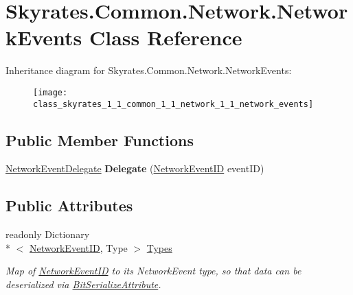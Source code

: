 \hypertarget{class_skyrates_1_1_common_1_1_network_1_1_network_events}{\section{Skyrates.\-Common.\-Network.\-Network\-Events Class Reference}
\label{class_skyrates_1_1_common_1_1_network_1_1_network_events}
}
Inheritance diagram for Skyrates.\-Common.\-Network.\-Network\-Events\-:\begin{figure}[H]
\begin{center}
\leavevmode
\texttt{[image: class\_skyrates\_1\_1\_common\_1\_1\_network\_1\_1\_network\_events]}
\end{center}
\end{figure}
\subsection*{Public Member Functions}
\begin{DoxyCompactItemize}
\item 
\hypertarget{class_skyrates_1_1_common_1_1_network_1_1_network_events_a8113fa3394ce40bd2caf8071863a3679}{\hyperlink{namespace_skyrates_1_1_common_1_1_network_a87882c06bd9c9c4138d4e098242f7b67}{Network\-Event\-Delegate} {\bfseries Delegate} (\hyperlink{namespace_skyrates_1_1_common_1_1_network_a90fc6faa44c44b4284114e861d3e761a}{Network\-Event\-I\-D} event\-I\-D)}\label{class_skyrates_1_1_common_1_1_network_1_1_network_events_a8113fa3394ce40bd2caf8071863a3679}

\end{DoxyCompactItemize}
\subsection*{Public Attributes}
\begin{DoxyCompactItemize}
\item 
readonly Dictionary\\*
$<$ \hyperlink{namespace_skyrates_1_1_common_1_1_network_a90fc6faa44c44b4284114e861d3e761a}{Network\-Event\-I\-D}, Type $>$ \hyperlink{class_skyrates_1_1_common_1_1_network_1_1_network_events_a9360ac6e13813aa04c2f77c18fea5274}{Types}
\begin{DoxyCompactList}\small\item\em Map of \hyperlink{namespace_skyrates_1_1_common_1_1_network_a90fc6faa44c44b4284114e861d3e761a}{Network\-Event\-I\-D} to its Network\-Event type, so that data can be deserialized via \hyperlink{class_skyrates_1_1_common_1_1_network_1_1_bit_serialize_attribute}{Bit\-Serialize\-Attribute}. \end{DoxyCompactList}\end{DoxyCompactItemize}
